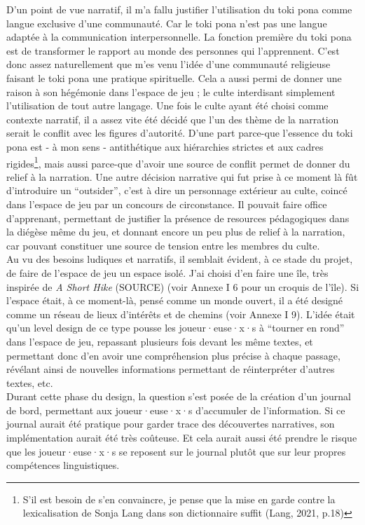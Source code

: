 \documentclass{scrartcl}
\begin{document}
	D'un point de vue narratif, il m'a fallu justifier l'utilisation du toki pona comme langue exclusive d'une communauté. Car le toki pona n'est pas une langue adaptée à la communication interpersonnelle. La fonction première du toki pona est de transformer le rapport au monde des personnes qui l'apprennent. C'est donc assez naturellement que m'es venu l'idée d'une communauté religieuse faisant le toki pona une pratique spirituelle. Cela a aussi permi de donner une raison à son hégémonie dans l'espace de jeu ; le culte interdisant simplement l'utilisation de tout autre langage. Une fois le culte ayant été choisi comme contexte narratif, il a assez vite été décidé que l'un des thème de la narration serait le conflit avec les figures d'autorité. D'une part parce-que l'essence du toki pona est - à mon sens - antithétique aux hiérarchies strictes et aux cadres rigides\footnote{S'il est besoin de s'en convaincre, je pense que la mise en garde contre la lexicalisation de Sonja Lang dans son dictionnaire suffit (Lang, 2021, p.18)}, mais aussi parce-que d'avoir une source de conflit permet de donner du relief à la narration. Une autre décision narrative qui fut prise à ce moment là fût d'introduire un “outsider”, c'est à dire un personnage extérieur au culte, coincé dans l'espace de jeu par un concours de circonstance. Il pouvait faire office d'apprenant, permettant de justifier la présence de resources pédagogiques dans la diégèse même du jeu, et donnant encore un peu plus de relief à la narration, car pouvant constituer une source de tension entre les membres du culte.\\
	Au vu des besoins ludiques et narratifs, il semblait évident, à ce stade du projet, de faire de l'espace de jeu un espace isolé. J'ai choisi d'en faire une île, très inspirée de \textit{A Short Hike} (SOURCE) (voir Annexe I 6 pour un croquis de l'île). Si l'espace était, à ce moment-là, pensé comme un monde ouvert, il a été designé comme un réseau de lieux d'intérêts et de chemins (voir Annexe I 9). L'idée était qu'un level design de ce type pousse les joueur·euse·x·s à “tourner en rond” dans l'espace de jeu, repassant plusieurs fois devant les même textes, et permettant donc d'en avoir une compréhension plus précise à chaque passage, révélant ainsi de nouvelles informations permettant de réinterpréter d'autres textes, etc.\\
	Durant cette phase du design, la question s'est posée de la création d'un journal de bord, permettant aux joueur·euse·x·s d'accumuler de l'information. Si ce journal aurait été pratique pour garder trace des découvertes narratives, son implémentation aurait été très coûteuse. Et cela aurait aussi été prendre le risque que les joueur·euse·x·s se reposent sur le journal plutôt que sur leur propres compétences linguistiques.\\
\end{document}

